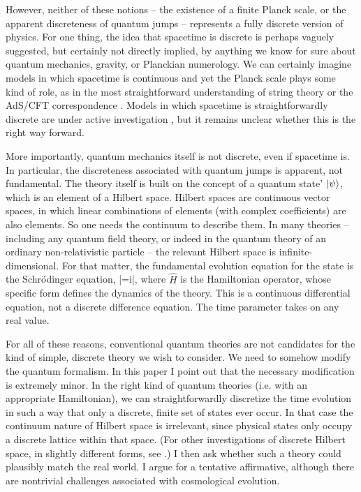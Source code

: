 \documentclass[aps,prd,nofootinbib,notitlepage,12pt]{revtex4-2}
\begin{document}
However, neither of these notions -- the existence of a finite Planck scale, or the apparent discreteness of quantum jumps -- represents a fully discrete version of physics.
For one thing, the idea that spacetime is discrete is perhaps vaguely suggested, but certainly not directly implied, by anything we know for sure about quantum mechanics, gravity, or Planckian numerology.
We can certainly imagine models in which spacetime is continuous and yet the Planck scale plays some kind of role, as in the most straightforward understanding of string theory or the AdS/CFT correspondence \cite{Maldacena:1997re}. 
Models in which spacetime is straightforwardly discrete are under active investigation \cite{Surya_2019}, but it remains unclear whether this is the right way forward.

More importantly, quantum mechanics itself is not discrete, even if spacetime is.
In particular, the discreteness associated with quantum jumps is apparent, not fundamental.
The theory itself is built on the concept of a quantum state' $\lvert \psi\rangle$, which is an element of a Hilbert space.
Hilbert spaces are continuous vector spaces, in which linear combinations of elements (with complex coefficients) are also elements.
So one needs the continuum to describe them.
In many theories -- including any quantum field theory, or indeed in the quantum theory of an ordinary non-relativistic particle -- the relevant Hilbert space is infinite-dimensional.
For that matter, the fundamental evolution equation for the state is the Schr\"odinger equation,
\be
{}\left|\psi\right\rangle=i\left|\psi\right\rangle,
\label{schr}
\ee
where $\hat{H}$ is the Hamiltonian operator, whose specific form defines the dynamics of the theory.
This is a continuous differential equation, not a discrete difference equation.
The time parameter takes on any real value.

For all of these reasons, conventional quantum theories are not candidates for the kind of simple, discrete theory we wish to consider.
We need to somehow modify the quantum formalism.
In this paper I point out that the necessary modification is extremely minor.
In the right kind of quantum theories (i.e. with an appropriate Hamiltonian), we can straightforwardly discretize the time evolution in such a way that only a discrete, finite set of states ever occur.
In that case the continuum nature of Hilbert space is irrelevant, since physical states only occupy a discrete lattice within that space.
(For other investigations of discrete Hilbert space, in slightly different forms, see \cite{Buniy2005,Palmer2022}.)
I then ask whether such a theory could plausibly match the real world.
I argue for a tentative affirmative, although there are nontrivial challenges associated with cosmological evolution.
\end{document}
